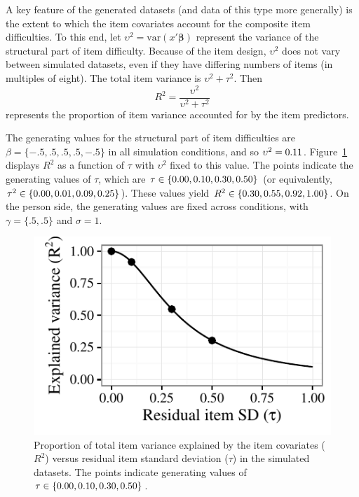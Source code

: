 \documentclass[12pt, letterpaper]{article}
\begin{document}


A key feature of the generated datasets (and data of this type more generally) is the extent to which the item covariates account for the composite item difficulties. To this end, let $\upsilon^2 = \mathrm{var}(x'\mathbf{\beta})$ represent the variance of the structural part of item difficulty. Because of the item design, $\upsilon^2$ does not vary between simulated datasets, even if they have differing numbers of items (in multiples of eight). The total item variance is $\upsilon^2 + \tau^2$. Then
\begin{equation}
R^2 = \frac{\upsilon^2}{\upsilon^2 + \tau^2}
\end{equation}
represents the proportion of item variance accounted for by the item predictors. 

The generating values for the structural part of item difficulties are $\beta = \{ -.5, .5, .5, .5, -.5 \}$ in all simulation conditions, and so $\upsilon^2 = 0.11$. Figure~\ref{fig:rsq-vs-tau} displays $R^2$ as a function of $\tau$ with $\upsilon^2$ fixed to this value. The points indicate the generating values of $\tau$, which are $\tau \in \{0.00, 0.10, 0.30, {} 0.50\}$ (or equivalently,  $\tau^2 \in \{0.00, 0.01, 0.09, {} 0.25\}$). These values yield $R^2 \in \{0.30, 0.55, 0.92, {} 1.00\}$. On the person side, the generating values are fixed across conditions, with $\gamma = \{ .5, .5 \}$ and $\sigma = 1$. 

\begin{figure}[tbp]
	\centering
	\includegraphics{chapter_2/figs/rsq_vs_tau.pdf}
	\caption{Proportion of total item variance explained by the item covariates ($R^2$) versus residual item standard deviation ($\tau$) in the simulated datasets. The points indicate generating values of $\tau \in \{0.00, 0.10, 0.30, {} 0.50\}$.}
	\label{fig:rsq-vs-tau}
\end{figure}
\end{document}
